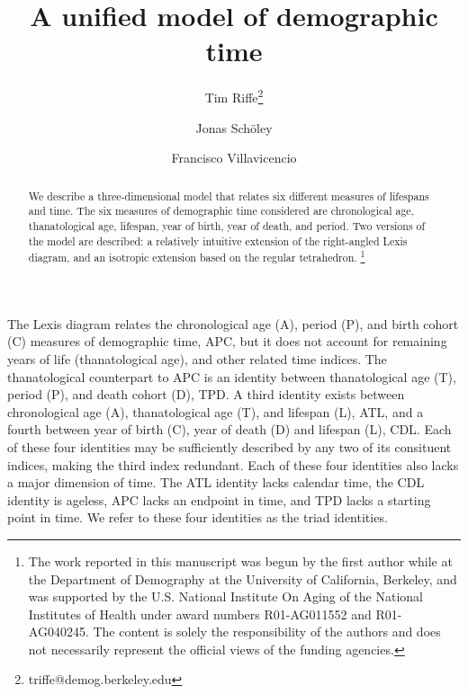 \documentclass[11pt,oneside,a4paper]{article} %
\newcommand\ackn[1]{%
  \begingroup
  \renewcommand\thefootnote{}\footnote{#1}%
  \addtocounter{footnote}{-1}%
  \endgroup
}
\begin{document}
\title{A unified model of demographic time}

\author[1]{Tim Riffe\thanks{triffe@demog.berkeley.edu}}
\author[2,3]{Jonas Sch{\"o}ley}
\author[2,3]{Francisco Villavicencio}


\maketitle

\begin{abstract}
We describe a three-dimensional model that relates six different measures of
lifespans and time. The six measures of demographic time considered are
chronological age, thanatological age, lifespan, year of birth, year of death,
and period. Two versions of the model are described: a relatively intuitive
extension of the right-angled Lexis diagram, and an isotropic extension based on
the regular tetrahedron. \ackn{The work reported in this manuscript was begun by
the first author while at the Department of Demography at the University of
California, Berkeley, and was supported by the U.S.
National Institute On Aging of the National Institutes of Health under award
numbers R01-AG011552 and R01-AG040245. The content is solely the responsibility of the authors and does not necessarily represent the official views of the funding agencies.}
\end{abstract}
The Lexis diagram relates the chronological age (A), period (P),
and birth cohort (C) measures of demographic time, APC, but it does not account
for remaining years of life (thanatological age), and other related time
indices.
The thanatological counterpart to APC is an identity between thanatological
age (T), period (P), and death cohort (D), TPD. A third
identity exists between chronological age (A), thanatological age (T), and lifespan (L), ATL, and a fourth between year of birth (C), year of death (D) and lifespan (L), CDL.
Each of these four identities may be sufficiently described by any
two of its consituent indices, making the third index redundant. Each of these
four identities also lacks a major dimension of time. The ATL identity
lacks calendar time, the CDL identity is ageless, APC lacks an endpoint in time,
and TPD lacks a starting point in time. We refer to these four identities
as the triad identities.
\end{document}
